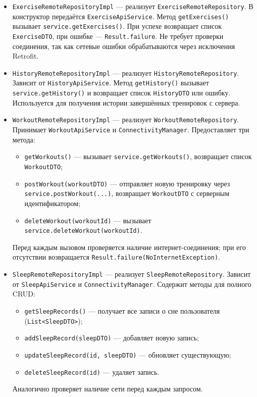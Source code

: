\begin{itemize}
    \item \texttt{ExerciseRemoteRepositoryImpl} — реализует \texttt{ExerciseRemoteRepository}. В конструктор передаётся \texttt{ExerciseApiService}. Метод \texttt{getExercises()} вызывает \texttt{service.getExercises()}. При успехе возвращает список \texttt{ExerciseDTO}, при ошибке — \texttt{Result.failure}. Не требует проверки соединения, так как сетевые ошибки обрабатываются через исключения Retrofit.

    \item \texttt{HistoryRemoteRepositoryImpl} — реализует \texttt{HistoryRemoteRepository}. Зависит от \texttt{HistoryApiService}. Метод \texttt{getHistory()} вызывает \texttt{service.getHistory()} и возвращает список \texttt{HistoryDTO} или ошибку. Используется для получения истории завершённых тренировок с сервера.

    \item \texttt{WorkoutRemoteRepositoryImpl} — реализует \texttt{WorkoutRemoteRepository}. Принимает \texttt{WorkoutApiService} и \texttt{ConnectivityManager}. Предоставляет три метода:
        \begin{itemize}
            \item \texttt{getWorkouts()} — вызывает \texttt{service.getWorkouts()}, возвращает список \texttt{WorkoutDTO};
            \item \texttt{postWorkout(workoutDTO)} — отправляет новую тренировку через \texttt{service.postWorkout(...)}, возвращает \texttt{WorkoutDTO} с серверным идентификатором;
            \item \texttt{deleteWorkout(workoutId)} — вызывает \texttt{service.deleteWorkout(workoutId)}.
        \end{itemize}
        Перед каждым вызовом проверяется наличие интернет-соединения; при его отсутствии возвращается \texttt{Result.failure(NoInternetException)}.

    \item \texttt{SleepRemoteRepositoryImpl} — реализует \texttt{SleepRemoteRepository}. Зависит от \texttt{SleepApiService} и \texttt{ConnectivityManager}. Содержит методы для полного CRUD:
        \begin{itemize}
            \item \texttt{getSleepRecords()} — получает все записи о сне пользователя (\texttt{List<SleepDTO>});
            \item \texttt{addSleepRecord(sleepDTO)} — добавляет новую запись;
            \item \texttt{updateSleepRecord(id, sleepDTO)} — обновляет существующую;
            \item \texttt{deleteSleepRecord(id)} — удаляет запись.
        \end{itemize}
        Аналогично проверяет наличие сети перед каждым запросом.


\end{itemize}
